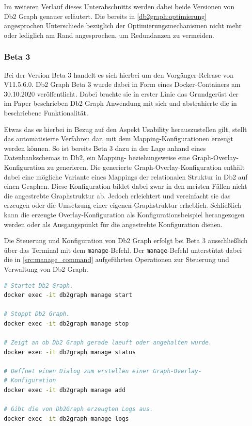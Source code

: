 Im weiteren Verlauf dieses Unterabschnitts werden dabei beide Versionen von Db2 Graph genauer erläutert. Die bereits in \autoref{db2graph:optimierung} angesprochen Unterschiede bezüglich der Optimierungsmechanismen nicht mehr oder lediglich am Rand angesprochen, um Redundanzen zu vermeiden. 

\subsubsection{Beta 3}

Bei der Version Beta 3 handelt es sich hierbei um den Vorgänger-Release von V11.5.6.0. Db2 Graph Beta 3 wurde dabei in Form eines Docker-Containers am 30.10.2020 veröffentlicht. Dabei brachte sie in erster Linie das Grundgerüst der im Paper \cite{sigmod_tian} beschrieben Db2 Graph Anwendung mit sich und abstrahierte die in \cite{sigmod_tian} beschriebene Funktionalität. 

Etwas das es hierbei in Bezug auf den Aspekt Usability herauszustellen gilt, stellt das automatisierte Verfahren dar, mit dem Mapping-Konfigurationen erzeugt werden können. So ist bereits Beta 3 dazu in der Lage anhand eines Datenbankschemas in Db2, ein Mapping- beziehungsweise eine Graph-Overlay-Konfiguration zu generieren. Die generierte Graph-Overlay-Konfiguration enthält dabei eine mögliche Variante eines Mappings der relationalen Struktur in Db2 auf einen Graphen. Diese Konfiguration bildet dabei zwar in den meisten Fällen nicht die angestrebte Graphstruktur ab. Jedoch erleichtert und vereinfacht sie das erzeugen oder die Umsetzung einer eigenen Graphstruktur erheblich. Schließlich kann die erzeugte Overlay-Konfiguration als Konfigurationsbeispiel herangezogen werden oder als Ausgangspunkt für die angestrebte Konfiguration dienen. 

Die Steuerung und Konfiguration von Db2 Graph erfolgt bei Beta 3 ausschließlich über das Terminal mit dem \texttt{manage}-Befehl. Der \texttt{manage}-Befehl unterstützt dabei die in \autoref{src:manage_command} aufgeführten Operationen zur Steuerung und Verwaltung von Db2 Graph. 

\begin{lstlisting}[label=src:manage_command,caption={Beispiel Steuerung und Verwaltung von  Db2 Graph Beta 3},language=BASH]
# Startet Db2 Graph.
docker exec -it db2graph manage start

# Stoppt Db2 Graph.
docker exec -it db2graph manage stop

# Zeigt an ob Db2 Graph gerade laeuft oder angehalten wurde.
docker exec -it db2graph manage status

# Oeffnet einen Dialog zum erstellen einer Graph-Overlay-
# Konfiguration
docker exec -it db2graph manage add

# Gibt die von Db2Graph erzeugten Logs aus.
docker exec -it db2graph manage logs
\end{lstlisting}

